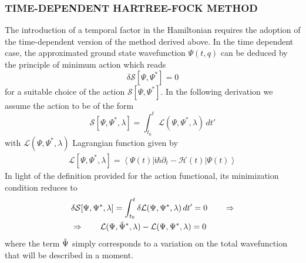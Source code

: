 \subsubsection{TIME-DEPENDENT HARTREE-FOCK METHOD}
The introduction of a temporal factor in the Hamiltonian requires the adoption of the time-dependent version of the method derived above. In the time dependent case, the approximated ground state wavefunction $\Psi(t, q)$ can be deduced by the principle of minimum action which reads
\begin{equation*}
    \delta \mathcal{S}[\Psi, \Psi^*] = 0
\end{equation*}
for a suitable choice of the action $\mathcal{S}[\Psi, \Psi^*]$. In the following derivation we assume the action to be of the form
\begin{equation*}
    \mathcal{S}[\Psi, \Psi^*, \lambda] = \int_{t_0}^t \mathcal{L}(\Psi, \Psi^*, \lambda) \, dt'
\end{equation*}
with $\mathcal{L}(\Psi, \Psi^*, \lambda)$ Lagrangian function given by
\begin{equation}
\begin{gathered}
    \mathcal{L}[\Psi, \Psi^*, \lambda] = \left\langle\Psi(t)\left|\mathfrak{i \hbar} \partial_{t}-\mathcal{H}(t)\right| \Psi(t)\right\rangle
\end{gathered}
\label{eq:lagrangian_def}
\end{equation}
In light of the definition provided for the action functional, its minimization condition reduces to 
\begin{align}
\begin{split}
    &\delta\mathcal{S}[\Psi, \Psi^*, \lambda] = \int_{t_0}^t \delta \mathcal{L}(\Psi, \Psi^*, \lambda) \, dt' = 0 \qquad \Rightarrow \\
    & \Rightarrow \qquad \mathcal{L}(\Psi, \Tilde{\Psi}^*, \lambda) -  \mathcal{L}(\Psi, \Psi^*, \lambda) = 0
\end{split}
\label{eq:minimiz_action}
\end{align}
where the term $\Tilde{\Psi}$ simply corresponds to a variation on the total wavefunction that will be described in a moment.


